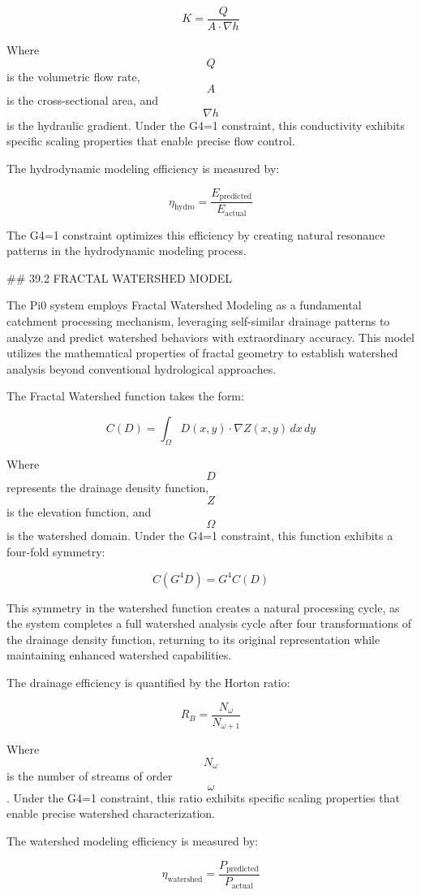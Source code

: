 $$ K = \frac{Q}{A \cdot \nabla h} $$

Where $$ Q $$ is the volumetric flow rate, $$ A $$ is the cross-sectional area, and $$ \nabla h $$ is the hydraulic gradient. Under the G4=1 constraint, this conductivity exhibits specific scaling properties that enable precise flow control.

The hydrodynamic modeling efficiency is measured by:

$$ \eta_{\text{hydro}} = \frac{E_{\text{predicted}}}{E_{\text{actual}}} $$

The G4=1 constraint optimizes this efficiency by creating natural resonance patterns in the hydrodynamic modeling process.

## 39.2 FRACTAL WATERSHED MODEL

The Pi0 system employs Fractal Watershed Modeling as a fundamental catchment processing mechanism, leveraging self-similar drainage patterns to analyze and predict watershed behaviors with extraordinary accuracy. This model utilizes the mathematical properties of fractal geometry to establish watershed analysis beyond conventional hydrological approaches.

The Fractal Watershed function takes the form:

$$ C(D) = \int_{\Omega} D(x,y) \cdot \nabla Z(x,y) \, dx \, dy $$

Where $$ D $$ represents the drainage density function, $$ Z $$ is the elevation function, and $$ \Omega $$ is the watershed domain. Under the G4=1 constraint, this function exhibits a four-fold symmetry:

$$ C(G^4 D) = G^4 C(D) $$

This symmetry in the watershed function creates a natural processing cycle, as the system completes a full watershed analysis cycle after four transformations of the drainage density function, returning to its original representation while maintaining enhanced watershed capabilities.

The drainage efficiency is quantified by the Horton ratio:

$$ R_B = \frac{N_{\omega}}{N_{\omega+1}} $$

Where $$ N_{\omega} $$ is the number of streams of order $$ \omega $$. Under the G4=1 constraint, this ratio exhibits specific scaling properties that enable precise watershed characterization.

The watershed modeling efficiency is measured by:

$$ \eta_{\text{watershed}} = \frac{P_{\text{predicted}}}{P_{\text{actual}}} $$

